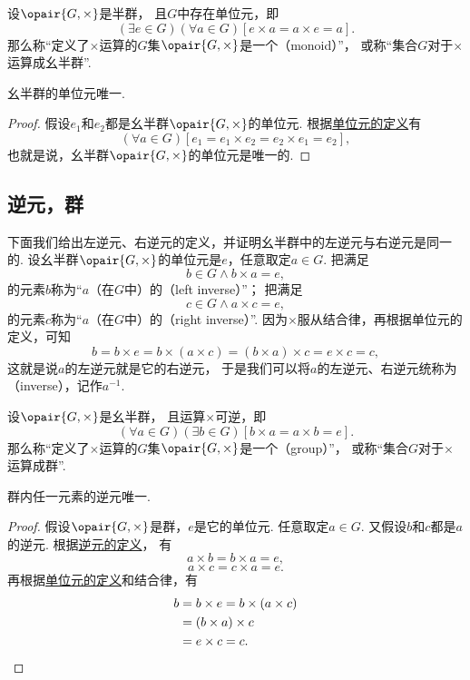 \begin{definition}\label{definition:抽象代数.幺半群的定义}
设\(\opair{G,\times}\)是半群，
且\(G\)中存在单位元，即\[
	(\exists e \in G)(\forall a \in G)
	[e \times a = a \times e = a].
\]
那么称“定义了\(\times\)运算的\(G\)集\(\opair{G,\times}\)是一个（monoid）”，
或称“集合\(G\)对于\(\times\)运算成幺半群”.
\end{definition}

\begin{theorem}\label{theorem:抽象代数.群内单位元唯一}
幺半群的单位元唯一.
\begin{proof}
假设\(e_1\)和\(e_2\)都是幺半群\(\opair{G,\times}\)的单位元.
根据\hyperref[definition:抽象代数.幺半群的定义]{单位元的定义}有\[
	(\forall a \in G)[
		e_1 = e_1 \times e_2 = e_2 \times e_1 = e_2
	],
\]
也就是说，幺半群\(\opair{G,\times}\)的单位元是唯一的.
\end{proof}
\end{theorem}

\subsection{逆元，群}
下面我们给出左逆元、右逆元的定义，并证明幺半群中的左逆元与右逆元是同一的.
设幺半群\(\opair{G,\times}\)的单位元是\(e\)，任意取定\(a \in G\).
把满足\[
	b \in G
	\land
	b \times a = e,
\]的元素\(b\)称为“\(a\)（在\(G\)中）的（left inverse）”；
把满足\[
	c \in G
	\land
	a \times c = e,
\]的元素\(c\)称为“\(a\)（在\(G\)中）的（right inverse）”.
因为\(\times\)服从结合律，再根据单位元的定义，可知\[
	b = b \times e = b \times (a \times c) = (b \times a) \times c = e \times c = c,
\]
这就是说\(a\)的左逆元就是它的右逆元，
于是我们可以将\(a\)的左逆元、右逆元统称为（inverse），记作\(a^{-1}\).

\begin{definition}\label{definition:抽象代数.群的定义}
设\(\opair{G,\times}\)是幺半群，
且运算\(\times\)可逆，即\[
	(\forall a \in G)(\exists b \in G)
	[b \times a = a \times b = e].
\]
那么称“定义了\(\times\)运算的\(G\)集\(\opair{G,\times}\)是一个（group）”，
或称“集合\(G\)对于\(\times\)运算成群”.
\end{definition}

\begin{theorem}\label{theorem:抽象代数.群内任一元的逆元唯一}
群内任一元素的逆元唯一.
\begin{proof}
假设\(\opair{G,\times}\)是群，\(e\)是它的单位元.
任意取定\(a \in G\).
又假设\(b\)和\(c\)都是\(a\)的逆元.
根据\hyperref[definition:抽象代数.群的定义]{逆元的定义}，
有\[
    a \times b = b \times a = e,
\]\[
    a \times c = c \times a = e.
\]
再根据\hyperref[definition:抽象代数.幺半群的定义]{单位元的定义}和结合律，有\begin{align*}
    b &= b \times e
	= b \times (a \times c) \\
    &= (b \times a) \times c \\
    &= e \times c
	= c.
	\qedhere
\end{align*}
\end{proof}
\end{theorem}

